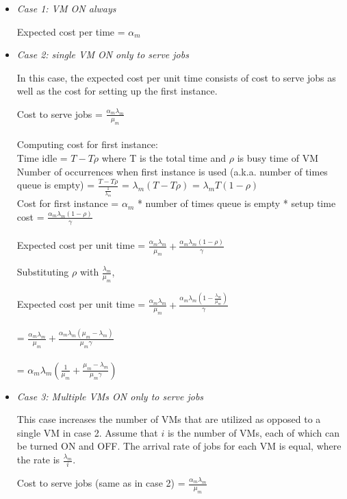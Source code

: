 \documentclass[letter,11pt]{article}
\begin{document}
\begin{itemize}
\item \textit{Case 1: VM ON always} 

Expected cost per time = $\alpha_m$ 

\item \textit{Case 2: single VM ON only to serve jobs} 

In this case, the expected cost per unit time consists of cost to serve jobs as well as the cost for setting up the first instance.

Cost to serve jobs  = $\frac{\alpha_m \lambda_m}{\mu_m}$ \\ \\
Computing cost for first instance: \\
Time idle = $T - T \rho$ where T is the total time and $\rho$ is busy time of VM \\
Number of occurrences when first instance is used (a.k.a. number of times 	queue is empty) = $\frac{T - T \rho}{\frac{1}{\lambda_m}}$
= $\lambda_m (T - T \rho)$ = $\lambda_m T (1 - \rho)$ \\
Cost for first instance = $\alpha_m$ * number of times queue is empty * setup time cost = $\frac{\alpha_m \lambda_m (1 - \rho)}{\gamma} $ \\ \\
Expected cost per unit time = $\frac{\alpha_m \lambda_m}{\mu_m} + \frac{\alpha_m \lambda_m (1 - \rho)}{\gamma} $ 

Substituting $\rho$ with $ \frac{\lambda_m}{\mu_m}$,

Expected cost per unit time = $\frac{\alpha_m \lambda_m}{\mu_m} + \frac{\alpha_m \lambda_m (1 - \frac{\lambda_m}{\mu_m})}{\gamma} $ \\ \\
= $\frac{\alpha_m \lambda_m}{\mu_m} + \frac{\alpha_m \lambda_m (\mu_m - \lambda_m)}{\mu_m \gamma} $ \\ \\
= $\alpha_m \lambda_m(\frac{1}{\mu_m} + \frac{\mu_m - \lambda_m}{\mu_m \gamma}) $

\item \textit{Case 3: Multiple VMs ON only to serve jobs} 

This case increases the number of VMs that are utilized as opposed to a single VM in case 2. Assume that $i$ is the number of VMs, each of which can be turned ON and OFF. The arrival rate of jobs for each VM is equal, where the rate is $\frac{\lambda_m}{i}$.

Cost to serve jobs (same as in case 2)  = $\frac{\alpha_m \lambda_m}{\mu_m}$


\end{itemize}
\end{document}
